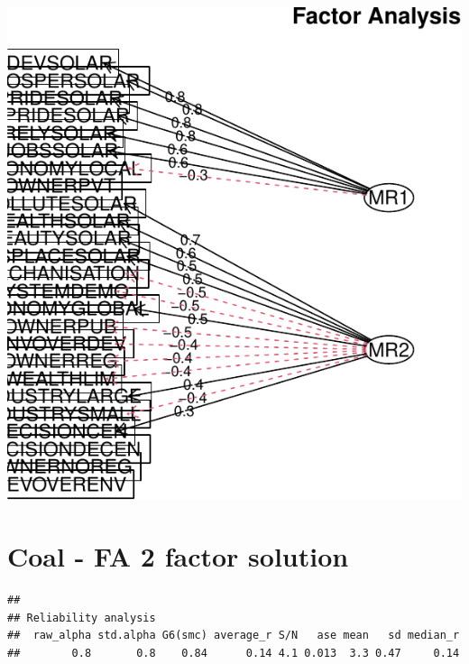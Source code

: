 \documentclass[
]{article}
\begin{document}
\includegraphics{module2PCAs_files/figure-latex/unnamed-chunk-11-1.pdf}

\newpage

\hypertarget{coal---fa-2-factor-solution}{%
\section{Coal - FA 2 factor
solution}\label{coal---fa-2-factor-solution}}

\begin{verbatim}
## 
## Reliability analysis   
##  raw_alpha std.alpha G6(smc) average_r S/N   ase mean   sd median_r
##        0.8       0.8    0.84      0.14 4.1 0.013  3.3 0.47     0.14
\end{verbatim}
\end{document}
